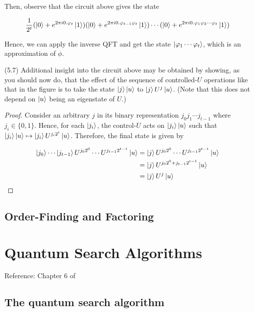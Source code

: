 \documentclass[main.tex]{subfiles}
\begin{document}
\begin{subappendices}
Then, observe that the circuit above gives the state 

\begin{align*}
\frac{1}{2^t}(\ket{0} + e^{2 \pi i 0.\varphi_t}\ket{1})(\ket{0} + e^{2 \pi i 0.\varphi_{t-1}\varphi_t}\ket{1})	\cdots (\ket{0} + e^{2 \pi i 0.\varphi_1\varphi_2\cdots\varphi_t}\ket{1})	
\end{align*}

Hence, we can apply the inverse QFT and get the state $\ket{\varphi_1 \cdots \varphi_t}$, which is an approximation of $\phi$. 

\begin{exercise}(5.7) Additional insight into the circuit above may be obtained by showing, as you should now do, that the effect of the sequence of controlled-$U$ operations like that in the figure is to take the state $\ket{j}\ket{u}$ to $\ket{j} U^j\ket{u}$. (Note that this does not depend on $\ket{u}$ being an eigenstate of $U$.)
\begin{proof}
	Consider an arbitrary $j$ in its binary representation $j_0j_1 \cdots j_{t-1}$ where $j_i \in \{ 0, 1\}$. Hence, for each $\ket{j_i}$, the control-$U$ acts on $\ket{j_i}\ket{u}$ such that $\ket{j_i}\ket{u} \mapsto \ket{j_i}U^{j_i 2^i}\ket{u}$. Therefore, the final state is given by
	
	\begin{align*}
	\ket{j_0 } \cdots \ket{j_{t-1}}U^{j_0 2^0} \cdots U^{j_{t-1} 2^{t-1}}\ket{u} &= \ket{j} U^{j_0 2^0} \cdots U^{j_{t-1} 2^{t-1}}\ket{u} \\
	&= \ket{j} U^{j_0 2^0 + j_{t-1} 2^{t-1}}\ket{u} \\
	&= \ket{j} U^{j}\ket{u}
	\end{align*}
\end{proof}
\end{exercise}

\subsection{Order-Finding and Factoring}

\section{Quantum Search Algorithms}
Reference: Chapter 6 of \cite{nielsen2010quantum}

\subsection{The quantum search algorithm}


\end{subappendices}
\end{document}
